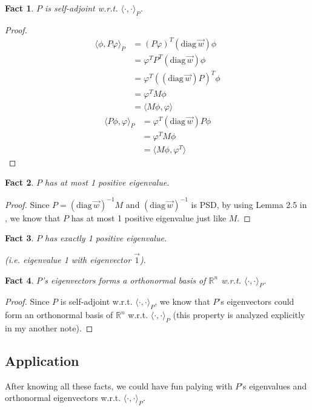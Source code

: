 \documentclass{article}
\newtheorem{fact}{Fact}[section]
\def\diag#1{(\mathrm{diag}\,#1)}
\def\<{\langle}
\def\>{\rangle}
\begin{document}
\begin{fact}
  $P$ is self-adjoint w.r.t. $\<\cdot, \cdot\>_P$.
\end{fact}
\begin{proof}
  \begin{align*}
    \<\phi, P\varphi\>_P
    &= (P\varphi)^T\diag{\vec{w}}\phi \\
    &= \varphi^TP^T\diag{\vec{w}}\phi \\
    &= \varphi^T(\diag{\vec{w}}P)^T\phi \\
    &= \varphi^TM\phi\\
    &= \<M\phi, \varphi\>
  \end{align*}
  \begin{align*}
    \<P\phi, \varphi\>_P
    &= \varphi^T \diag{\vec{w}}P\phi \\
    &= \varphi^T M\phi \\
    &= \<M\phi, \varphi^T\>
  \end{align*}
\end{proof}

\begin{fact}
  $P$ has at most 1 positive eigenvalue.
\end{fact}
\begin{proof}
Since $P = \diag{\vec{w}}^{-1} M$ and $\diag{\vec{w}}^{-1}$ is PSD, by using Lemma 2.5 in \cite{anari2019log}, we know that $P$ has at most 1 positive eigenvalue just like $M$.
\end{proof}

\begin{fact}
  $P$ has exactly 1 positive eigenvalue.
  
  (i.e. eigenvalue 1 with eigenvector $\vec{1}$).
\end{fact}

\begin{fact}
  $P$'s eigenvectors forms a orthonormal basis of $\mathbb{R}^n$ w.r.t. $\<\cdot, \cdot\>_P$.
\end{fact}
\begin{proof}
Since $P$ is self-adjoint w.r.t. $\<\cdot, \cdot\>_P$, we know that $P$'s eigenvectors could form an orthonormal basis of $\mathbb{R}^n$ w.r.t. $\<\cdot, \cdot\>_P$ (this property is analyzed explicitly in my another note).
\end{proof}

\subsection{Application}
After knowing all these facts, we could have fun palying with $P$'s eigenvalues and orthonormal eigenvectors w.r.t. $\<\cdot, \cdot\>_P$.
\end{document}

